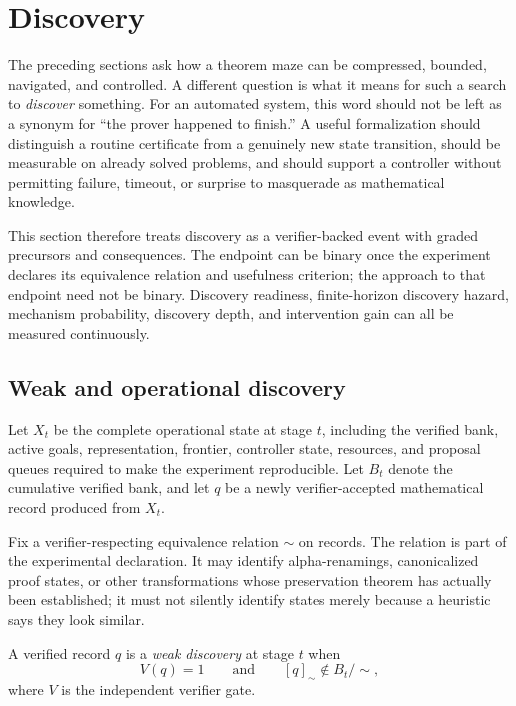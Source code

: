 \section{Discovery}\label{sec:discovery}

The preceding sections ask how a theorem maze can be compressed, bounded, navigated, and controlled. A different question is what it means for such a search to \emph{discover} something. For an automated system, this word should not be left as a synonym for ``the prover happened to finish.'' A useful formalization should distinguish a routine certificate from a genuinely new state transition, should be measurable on already solved problems, and should support a controller without permitting failure, timeout, or surprise to masquerade as mathematical knowledge.

This section therefore treats discovery as a verifier-backed event with graded precursors and consequences. The endpoint can be binary once the experiment declares its equivalence relation and usefulness criterion; the approach to that endpoint need not be binary. Discovery readiness, finite-horizon discovery hazard, mechanism probability, discovery depth, and intervention gain can all be measured continuously.

\subsection{Weak and operational discovery}
Let $X_t$ be the complete operational state at stage $t$, including the verified bank, active goals, representation, frontier, controller state, resources, and proposal queues required to make the experiment reproducible. Let $B_t$ denote the cumulative verified bank, and let $q$ be a newly verifier-accepted mathematical record produced from $X_t$.

Fix a verifier-respecting equivalence relation $\sim$ on records. The relation is part of the experimental declaration. It may identify alpha-renamings, canonicalized proof states, or other transformations whose preservation theorem has actually been established; it must not silently identify states merely because a heuristic says they look similar.

\begin{definition}
A verified record $q$ is a \emph{weak discovery} at stage $t$ when
\[
V(q)=1
\qquad\text{and}\qquad
[q]_{\sim}\notin B_t/\!\sim,
\]
where $V$ is the independent verifier gate.
\end{definition}

